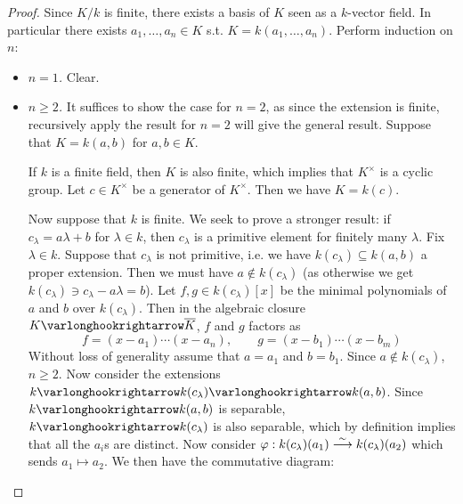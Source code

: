 \begin{proof}
    Since $K/k$ is finite, there exists a basis of $K$ seen as a $k$-vector field. In particular there exists $a_1, \dots, a_n \in K$ s.t. $K = k(a_1, \dots, a_n)$. Perform induction on $n$:
    \begin{itemize}
        \item \emph{$n = 1$.} Clear.
        \item \emph{$n \geq 2$.} It suffices to show the case for $n = 2$, as since the extension is finite, recursively apply the result for $n = 2$ will give the general result. Suppose that $K = k(a, b)$ for $a, b \in K$. 
        
        If $k$ is a finite field, then $K$ is also finite, which implies that $K^{\times}$ is a cyclic group. Let $c \in K^{\times}$ be a generator of $K^{\times}$. Then we have $K = k(c)$.

        Now suppose that $k$ is finite. We seek to prove a stronger result: if $c_{\lambda} = a \lambda + b$ for $\lambda \in k$, then $c_{\lambda}$ is a primitive element for finitely many $\lambda$. Fix $\lambda \in k$. Suppose that $c_{\lambda}$ is not primitive, i.e. we have $k(c_{\lambda}) \subseteq k(a, b)$ a proper extension. Then we must have $a \notin k(c_{\lambda})$ (as otherwise we get $k(c_{\lambda}) \ni c_{\lambda} - a\lambda = b$). Let $f, g \in k(c_{\lambda})[x]$ be the minimal polynomials of $a$ and $b$ over $k(c_{\lambda})$. Then in the algebraic closure $K \ext \overline{K}$, $f$ and $g$ factors as 
        \[
            f = (x - a_1) \cdots (x - a_n), \qquad g = (x - b_1) \cdots (x - b_m)
        \]
        Without loss of generality assume that $a = a_1$ and $b = b_1$. Since $a \notin k(c_{\lambda})$, $n \geq 2$. Now consider the extensions $k \ext k(c_{\lambda}) \ext k(a, b)$. Since $k \ext k(a, b)$ is separable, $k \ext k(c_{\lambda})$ is also separable, which by definition implies that all the $a_i$s are distinct. Now consider $\varphi: k(c_{\lambda})(a_1) \overset{\sim}{\longrightarrow} k(c_{\lambda})(a_2)$ which sends $a_1 \mapsto a_2$. We then have the commutative diagram:


\end{itemize}
\end{proof}
